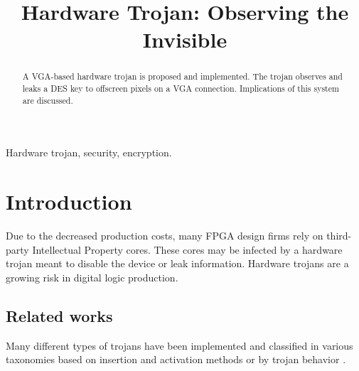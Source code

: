 
\usepackage{tikz}
\usetikzlibrary{shapes}
\usepackage{verbatim}
\usepackage{listings}


\title{Hardware Trojan: Observing the Invisible}

\author{
}

\maketitle


\begin{abstract}
	A VGA-based hardware trojan is proposed and implemented. The trojan observes and leaks a DES key to offscreen pixels on a VGA connection. Implications of this system are discussed. 
\end{abstract}

\begin{IEEEkeywords}
Hardware trojan, security, encryption. 
\end{IEEEkeywords}

\section{Introduction}
	Due to the decreased production costs, many FPGA design firms rely on third-party Intellectual Property cores. These cores may be infected by a hardware trojan meant to disable the device or leak information. Hardware trojans are a growing risk in digital logic production. 
\subsection{Related works}
	Many different types of trojans have been implemented and classified in various taxonomies based on insertion and activation methods \cite{karri2010trustworthy} or by trojan behavior \cite{wang2008detecting}. 

